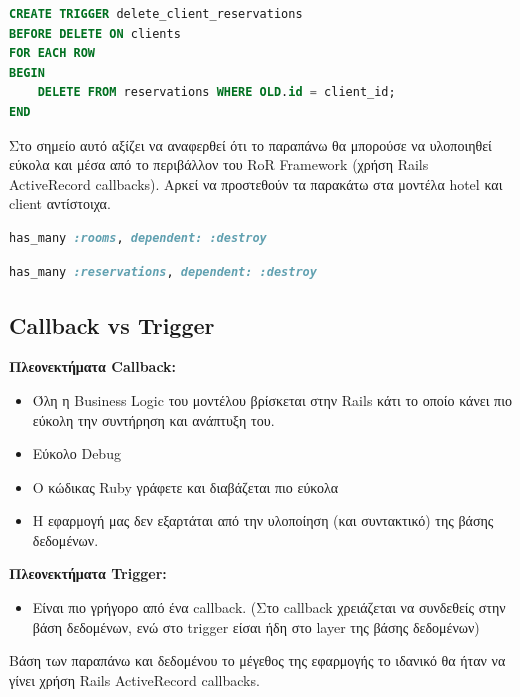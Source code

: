 \documentclass[a4paper,12pt]{article}
\begin{document}
\begin{lstlisting}[language=SQL]
CREATE TRIGGER delete_client_reservations
BEFORE DELETE ON clients 
FOR EACH ROW
BEGIN
	DELETE FROM reservations WHERE OLD.id = client_id;
END
\end{lstlisting}

Στο σημείο αυτό αξίζει να αναφερθεί ότι το παραπάνω θα μπορούσε να υλοποιηθεί εύκολα και μέσα από το περιβάλλον του RoR Framework (χρήση Rails ActiveRecord callbacks). Αρκεί να προστεθούν τα παρακάτω στα μοντέλα hotel και client αντίστοιχα.

\begin{lstlisting}[language=Ruby]
has_many :rooms, dependent: :destroy
\end{lstlisting}

\begin{lstlisting}[language=Ruby]
has_many :reservations, dependent: :destroy
\end{lstlisting}

\subsection{Callback vs Trigger}
	\textbf{Πλεονεκτήματα Callback:}
	\begin{itemize}
	  \item Όλη η Business Logic του μοντέλου βρίσκεται στην Rails κάτι το οποίο κάνει πιο εύκολη την συντήρηση και ανάπτυξη του.
	  \item Εύκολο Debug
	  \item Ο κώδικας Ruby γράφετε και διαβάζεται πιο εύκολα
	  \item Η εφαρμογή μας δεν εξαρτάται από την υλοποίηση (και συντακτικό) της βάσης δεδομένων.
	\end{itemize}
	\textbf{Πλεονεκτήματα Trigger:}
	\begin{itemize}
	  \item Είναι πιο γρήγορο από ένα callback. (Στο callback χρειάζεται να συνδεθείς στην βάση δεδομένων, ενώ στο trigger είσαι ήδη στο layer της βάσης δεδομένων)
	\end{itemize}
	Βάση των παραπάνω και δεδομένου το μέγεθος της εφαρμογής το ιδανικό θα ήταν να γίνει χρήση Rails ActiveRecord callbacks.
\end{document}
